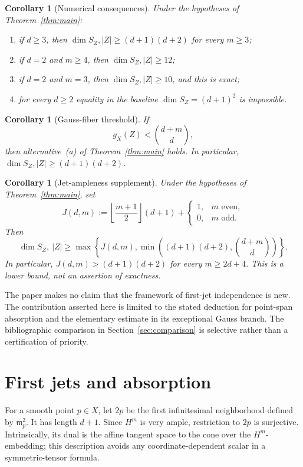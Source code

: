 \documentclass[11pt]{article}
\newtheorem{corollary}[theorem]{Corollary}
\begin{document}
\begin{corollary}[Numerical consequences]\label{cor:numerical}
Under the hypotheses of Theorem~\ref{thm:main}:
\begin{enumerate}[label=(\roman*)]
\item if $d\geq3$, then
$\dim S_Z,|Z|\geq(d+1)(d+2)$ for every $m\geq3$;
\item if $d=2$ and $m\geq4$, then
$\dim S_Z,|Z|\geq12$;
\item if $d=2$ and $m=3$, then $\dim S_Z,|Z|\geq10$, and this is exact;
\item for every $d\geq2$ equality in the baseline
$\dim S_Z=(d+1)^2$ is impossible.
\end{enumerate}
\end{corollary}

\begin{corollary}[Gauss-fiber threshold]\label{cor:gauss-threshold}
If
\[
 g_X(Z)<\binom{d+m}{d},
\]
then alternative~\textup{(a)} of Theorem~\ref{thm:main} holds.  In
particular, $\dim S_Z,|Z|\geq(d+1)(d+2)$.
\end{corollary}

\begin{corollary}[Jet-ampleness supplement]\label{cor:jet-supplement}
Under the hypotheses of Theorem~\ref{thm:main}, set
\[
 J(d,m):=\left\lfloor\frac{m+1}{2}\right\rfloor(d+1)
          +\begin{cases}1,&m\text{ even},\\0,&m\text{ odd}.
            \end{cases}
\]
Then
\[
 \dim S_Z,\ |Z|\geq
 \max\left\{J(d,m),
 \min\left((d+1)(d+2),\binom{d+m}{d}\right)\right\}.
\]
In particular, $J(d,m)>(d+1)(d+2)$ for every $m\geq2d+4$.
This is a lower bound, not an assertion of exactness.
\end{corollary}

The paper makes no claim that the framework of first-jet independence is
new.  The contribution asserted here is limited to the stated deduction for
point-span absorption and the elementary estimate in its exceptional Gauss
branch.  The bibliographic comparison in Section~\ref{sec:comparison} is
selective rather than a certification of priority.

\section{First jets and absorption}\label{sec:setup}

For a smooth point $p\in X$, let $2p$ be the first infinitesimal neighborhood
defined by $\mathfrak m_p^2$.  It has length $d+1$.  Since $H^m$ is very
ample, restriction to $2p$ is surjective.  Intrinsically, its dual is the
affine tangent space to the cone over the $H^m$-embedding; this description
avoids any coordinate-dependent scalar in a symmetric-tensor formula.
\end{document}
